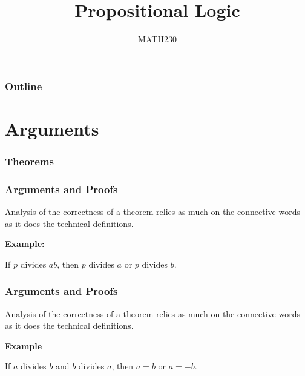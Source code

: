 \documentclass{beamer}
\title{Propositional Logic}
\author{MATH230}
\institute{Te Kura P\=angarau \\ Te Whare W\=ananga o Waitaha}
\date{}
\theoremstyle{indentDefn} \newtheorem{defn}[]{Definition}
\begin{document}
\begin{frame}

  \titlepage

\end{frame}

\begin{frame}
  \frametitle{Outline}

  \tableofcontents

\end{frame}

\section{Arguments}

\begin{frame}
	\frametitle{Theorems}


\end{frame}

\begin{frame}
  \frametitle{Arguments and Proofs}

	Analysis of the correctness of a theorem relies as much on the connective words as it does the technical definitions. 

\vspace{0.5cm}

{\bf Example: }
 
If $p$ divides $ab$, then $p$ divides $a$ or $p$ divides $b$.
  
\vspace{4cm}


\end{frame}

\begin{frame}
	\frametitle{Arguments and Proofs}
  
	Analysis of the correctness of a theorem relies as much on the connective words as it does the technical definitions. 
  
  {\bf Example}
  
  If $a$ divides $b$ and $b$ divides $a$, then $a = b$ or $a = -b$. 

  \vspace{5cm}
  
  \end{frame}
\end{document}
